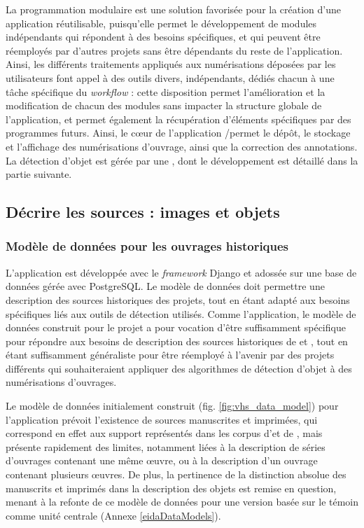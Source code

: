     La programmation modulaire est une solution favorisée pour la création d'une application réutilisable, puisqu'elle permet le développement de modules indépendants qui répondent à des besoins spécifiques, et qui peuvent être réemployés par d'autres projets sans être dépendants du reste de l'application. Ainsi, les différents traitements appliqués aux numérisations déposées par les utilisateurs font appel à des outils divers, indépendants, dédiés chacun à une tâche spécifique du \textit{workflow} : cette disposition permet l'amélioration et la modification de chacun des modules sans impacter la structure globale de l'application, et permet également la récupération d'éléments spécifiques par des programmes futurs. Ainsi, le cœur de l'application \eida/\vhs permet le dépôt, le stockage et l'affichage des numérisations d'ouvrage, ainsi que la correction des annotations. La détection d'objet est gérée par une \api, dont le développement est détaillé dans la partie suivante.
    
\subsection{Décrire les sources : images et objets}
    \subsubsection{Modèle de données pour les ouvrages historiques}
    
    L'application \vhs est développée avec le \textit{framework} Django et adossée sur une base de données gérée avec PostgreSQL. Le modèle de données doit permettre une description des sources historiques des projets, tout en étant adapté aux besoins spécifiques liés aux outils de détection utilisés. Comme l'application, le modèle de données construit pour le projet a pour vocation d'être suffisamment spécifique pour répondre aux besoins de description des sources historiques de \vhs et \eida, tout en étant suffisamment généraliste pour être réemployé à l'avenir par des projets différents qui souhaiteraient appliquer des algorithmes de détection d'objet à des numérisations d'ouvrages.
    
    Le modèle de données initialement construit (fig. \ref{fig:vhs_data_model}) pour l'application \vhs prévoit l'existence de sources manuscrites et imprimées, qui correspond en effet aux support représentés dans les corpus d'\eida et de \vhs, mais présente rapidement des limites, notamment liées à la description de séries d'ouvrages contenant une même œuvre, ou à la description d'un ouvrage contenant plusieurs œuvres. De plus, la pertinence de la distinction absolue des manuscrits et imprimés dans la description des objets est remise en question, menant à la refonte de ce modèle de données pour une version basée sur le témoin comme unité centrale (Annexe \ref{eidaDataModels}). 
    
